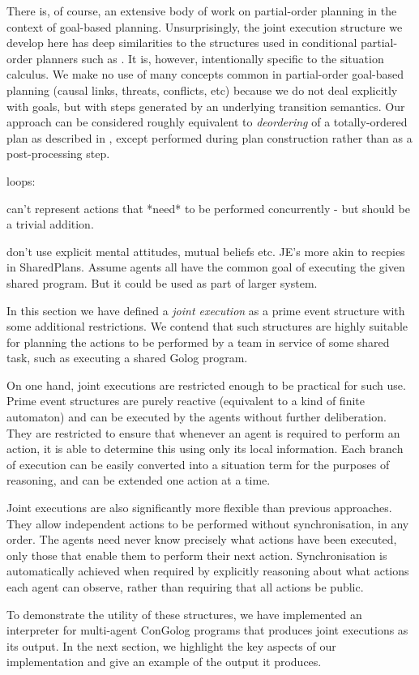 There is, of course, an extensive body of work on partial-order planning
in the context of goal-based planning. Unsurprisingly, the joint execution
structure we develop here has deep similarities to the structures
used in conditional partial-order planners such as \citep{peot92conditional_nonlinear}.
It is, however, intentionally specific to the situation calculus.
We make no use of many concepts common in partial-order goal-based
planning (causal links, threats, conflicts, etc) because we do not
deal explicitly with goals, but with steps generated by an underlying
transition semantics. Our approach can be considered roughly equivalent
to \emph{deordering} of a totally-ordered plan as described in \citep{backstrom99reordering},
except performed during plan construction rather than as a post-processing
step.

loops: \citep{levesque96what_is_planning,levesque05planning_with_loops}

can't represent actions that {*}need{*} to be performed concurrently
- but should be a trivial addition.

don't use explicit mental attitudes, mutual beliefs etc. JE's more
akin to recpies in SharedPlans. Assume agents all have the common
goal of executing the given shared program. But it could be used as
part of larger system.

In this section we have defined a \emph{joint execution} as a prime
event structure with some additional restrictions. We contend that
such structures are highly suitable for planning the actions to be
performed by a team in service of some shared task, such as executing
a shared Golog program.

On one hand, joint executions are restricted enough to be practical
for such use. Prime event structures are purely reactive (equivalent
to a kind of finite automaton) and can be executed by the agents without
further deliberation. They are restricted to ensure that whenever
an agent is required to perform an action, it is able to determine
this using only its local information. Each branch of execution can
be easily converted into a situation term for the purposes of reasoning,
and can be extended one action at a time.

Joint executions are also significantly more flexible than previous
approaches. They allow independent actions to be performed without
synchronisation, in any order. The agents need never know precisely
what actions have been executed, only those that enable them to perform
their next action. Synchronisation is automatically achieved when
required by explicitly reasoning about what actions each agent can
observe, rather than requiring that all actions be public.

To demonstrate the utility of these structures, we have implemented
an interpreter for multi-agent ConGolog programs that produces joint
executions as its output. In the next section, we highlight the key
aspects of our implementation and give an example of the output it
produces.

